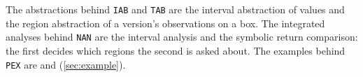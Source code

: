 The abstractions behind \texttt{IAB} and \texttt{TAB} are the interval abstraction of
 values and the region abstraction of a version's observations on a box. The
integrated analyses behind \texttt{NAN} are the interval analysis and the symbolic return
comparison: the first decides which regions the second is asked about. The examples behind
\texttt{PEX} are  and  (\cref{sec:example}).

